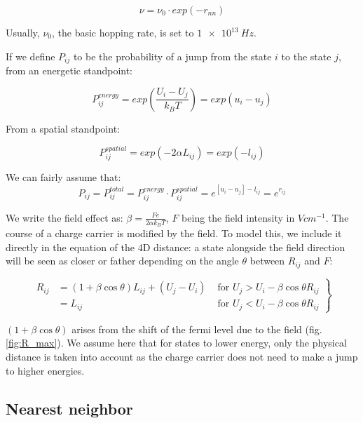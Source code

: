 \begin{equation}
    \nu = \nu_0 \cdot exp(-r_{nn})
    \label{eq:3_1.1}
\end{equation}

Usually, $\nu_0$, the basic hopping rate, is set to $\SI{1e13}{Hz}$.

If we define $P_{ij}$ to be the probability of a jump from the state $i$ to the state $j$, from an energetic standpoint:

\begin{equation}
    P_{ij}^{energy} = exp\left(\frac{U_i - U_j}{k_BT}\right) = exp(u_i - u_j)
\end{equation}

From a spatial standpoint:

\begin{equation}
    P_{ij}^{spatial} = exp\left(-2\alpha L_{ij}\right) = exp(-l_{ij})
\end{equation}

We can fairly assume that:
\begin{equation}
    P_{ij} = P_{ij}^{total} = P_{ij}^{energy} \cdot P_{ij}^{spatial} = e^{[u_i - u_j] - l_{ij}} = e^{r_{ij}}
    \label{eq:3_1}
\end{equation}

We write the field effect as: $\beta = \frac{Fe}{2\alpha k_BT}$, $F$ being the field intensity in $V cm^{-1}$. The course of a charge carrier is modified by the field. To model this, we include it directly in the equation of the 4D distance: a state alongside the field direction will be seen as  closer or father depending on the angle $\theta$ between $R_{ij}$ and $F$:

\begin{equation}
    \left.\begin{array}{rlr}
    R_{i j} & =(1+\beta \cos \theta) L_{i j}+\left(U_{j}-U_{i}\right) & \text { for } U_{j}>U_{i}-\beta \cos \theta R_{i j} \\
    & =L_{i j} & \text { for } U_{j}<U_{i}-\beta \cos \theta R_{i j}
    \end{array}\right\}
    \label{eq:3_2}
\end{equation}

$(1+\beta \cos \theta)$ arises from the shift of the fermi level due to the field (fig. \ref{fig:R_max}). We assume here that for states to lower energy, only the physical distance is taken into account as the charge carrier does not need to make a jump to higher energies.

\subsection{Nearest neighbor}

